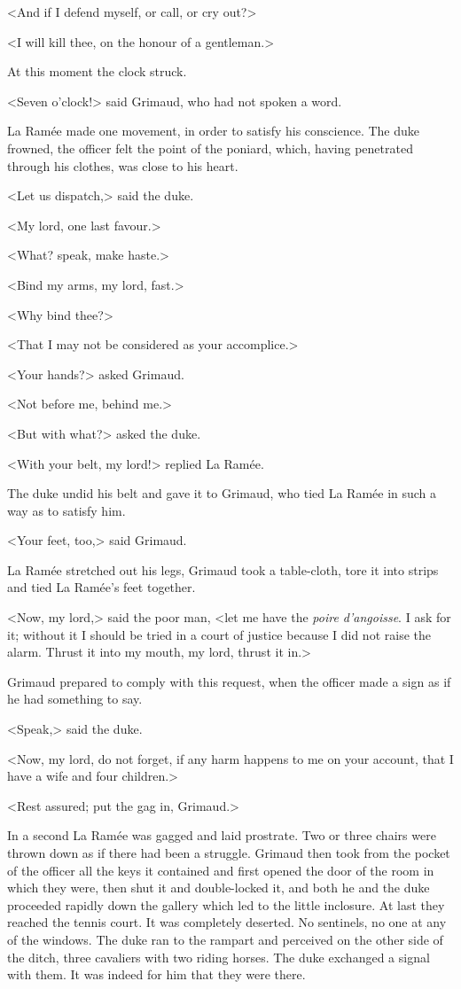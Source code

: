 <And if I defend myself, or call, or cry out?>

<I will kill thee, on the honour of a gentleman.>

At this moment the clock struck.

<Seven o'clock!> said Grimaud, who had not spoken a word.

La Ramée made one movement, in order to satisfy his conscience. The duke frowned, the officer felt the point of the poniard, which, having penetrated through his clothes, was close to his heart.

<Let us dispatch,> said the duke.

<My lord, one last favour.>

<What? speak, make haste.>

<Bind my arms, my lord, fast.>

<Why bind thee?>

<That I may not be considered as your accomplice.>

<Your hands?> asked Grimaud.

<Not before me, behind me.>

<But with what?> asked the duke.

<With your belt, my lord!> replied La Ramée.

The duke undid his belt and gave it to Grimaud, who tied La Ramée in such a way as to satisfy him.

<Your feet, too,> said Grimaud.

La Ramée stretched out his legs, Grimaud took a table-cloth, tore it into strips and tied La Ramée's feet together.

<Now, my lord,> said the poor man, <let me have the \textit{poire d'angoisse}. I ask for it; without it I should be tried in a court of justice because I did not raise the alarm. Thrust it into my mouth, my lord, thrust it in.>

Grimaud prepared to comply with this request, when the officer made a sign as if he had something to say.

<Speak,> said the duke.

<Now, my lord, do not forget, if any harm happens to me on your account, that I have a wife and four children.>

<Rest assured; put the gag in, Grimaud.>

In a second La Ramée was gagged and laid prostrate. Two or three chairs were thrown down as if there had been a struggle. Grimaud then took from the pocket of the officer all the keys it contained and first opened the door of the room in which they were, then shut it and double-locked it, and both he and the duke proceeded rapidly down the gallery which led to the little inclosure. At last they reached the tennis court. It was completely deserted. No sentinels, no one at any of the windows. The duke ran to the rampart and perceived on the other side of the ditch, three cavaliers with two riding horses. The duke exchanged a signal with them. It was indeed for him that they were there.


